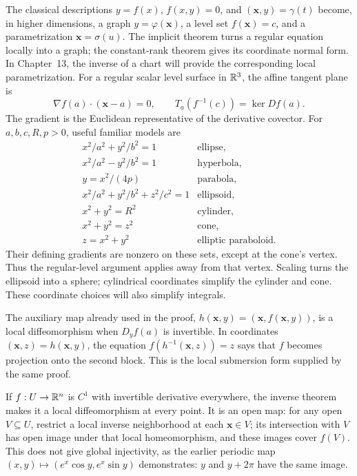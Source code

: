 \begin{remark}
The classical descriptions $y=f(x)$, $f(x,y)=0$, and
$(\mathbf{x},y)=\gamma(t)$ become, in higher dimensions, a graph $y=\varphi(\mathbf{x})$,
a level set $f(\mathbf{x})=c$, and a parametrization $\mathbf{x}=\sigma(u)$.
The implicit theorem turns a regular equation locally into a graph;
the constant-rank theorem gives its coordinate normal form. In Chapter~13,
the inverse of a chart will provide the corresponding local parametrization.
For a regular scalar level surface in $\mathbb{R}^3$, the affine tangent plane is
\[
\nabla f(a)\cdot(\mathbf{x}-a)=0,
\qquad T_a(f^{-1}(c))=\ker Df(a).
\]
The gradient is the Euclidean representative of the derivative covector.
For $a,b,c,R,p>0$, useful familiar models are
\[
\begin{array}{ll}
x^2/a^2+y^2/b^2=1&\text{ellipse},\\
x^2/a^2-y^2/b^2=1&\text{hyperbola},\\
y=x^2/(4p)&\text{parabola},\\
x^2/a^2+y^2/b^2+z^2/c^2=1&\text{ellipsoid},\\
x^2+y^2=R^2&\text{cylinder},\\
x^2+y^2=z^2&\text{cone},\\
z=x^2+y^2&\text{elliptic paraboloid}.
\end{array}
\]
Their defining gradients are nonzero on these sets, except at the cone's
vertex. Thus the regular-level argument applies away from that vertex.
Scaling turns the ellipsoid into a sphere; cylindrical coordinates simplify
the cylinder and cone. These coordinate choices will also simplify integrals.
\end{remark}


The auxiliary map already used in the proof,
$h(\mathbf{x},y)=(\mathbf{x},f(\mathbf{x},y))$, is a local diffeomorphism when $D_yf(a)$ is invertible.
In coordinates $(\mathbf{x},z)=h(\mathbf{x},y)$, the equation
$f(h^{-1}(\mathbf{x},z))=z$ says that $f$ becomes projection onto the second block.
This is the local submersion form supplied by the same proof.

If $f:U\to\mathbb{R}^n$ is $C^1$ with invertible derivative everywhere, the inverse
theorem makes it a local diffeomorphism at every point. It is an open map:
for any open $V\subseteq U$, restrict a local inverse neighborhood at each
$\mathbf{x}\in V$; its intersection with $V$ has open image under that local
homeomorphism, and these images cover $f(V)$. This does not give global
injectivity, as the earlier periodic map $(x,y)\mapsto(e^x\cos y,e^x\sin y)$
demonstrates: $y$ and $y+2\pi$ have the same image.


